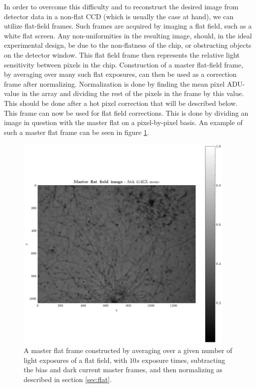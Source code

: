 \documentclass[../main.tex]{subfiles}
\begin{document}
	In order to overcome this difficulty and to reconstruct the desired image from detector data in a non-flat CCD (which is usually the case at hand), we can utilize flat-field frames. Such frames are acquired by imaging a flat field, such as a white flat screen. Any non-uniformities in the resulting image, should, in the ideal experimental design, be due to the non-flatness of the chip, or obstructing objects on the detector window. This flat field frame then represents the relative light sensitivity between pixels in the chip. Construction of a master flat-field frame, by averaging over many such flat exposures, can then be used as a correction frame after normalizing. Normalization is done by finding the mean pixel ADU-value in the array and dividing the rest of the pixels in the frame by this value. This should be done after a hot pixel correction that will be described below. This frame can now be used for flat field corrections. This is done by dividing an image in question with the master flat on a pixel-by-pixel basis. An example of such a master flat frame can be seen in figure \ref{fig:masterflat}.
	
		\begin{figure}[h!]
		\centering
		\includegraphics[width	=0.95\textwidth]{master_flat.png}
		\caption{A master flat frame constructed by averaging over a given number of light exposures of a flat field, with $10s$ exposure times, subtracting the bias and dark current master frames, and then normalizing as described in section \ref{sec:flat}. }
		\label{fig:masterflat}
	\end{figure}
	
\end{document}
